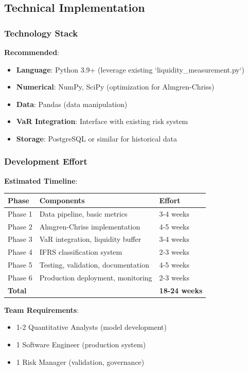\documentclass[11pt,a4paper]{article}
\begin{document}
\subsection{Technical Implementation}

\subsubsection{Technology Stack}

\textbf{Recommended}:
\begin{itemize}
    \item \textbf{Language}: Python 3.9+ (leverage existing `liquidity\_measurement.py`)
    \item \textbf{Numerical}: NumPy, SciPy (optimization for Almgren-Chriss)
    \item \textbf{Data}: Pandas (data manipulation)
    \item \textbf{VaR Integration}: Interface with existing risk system
    \item \textbf{Storage}: PostgreSQL or similar for historical data
\end{itemize}

\subsubsection{Development Effort}

\textbf{Estimated Timeline}:

\begin{table}[h]
\centering
\begin{tabular}{@{}lll@{}}
\toprule
Phase & Components & Effort \\
\midrule
Phase 1 & Data pipeline, basic metrics & 3-4 weeks \\
Phase 2 & Almgren-Chriss implementation & 4-5 weeks \\
Phase 3 & VaR integration, liquidity buffer & 3-4 weeks \\
Phase 4 & IFRS classification system & 2-3 weeks \\
Phase 5 & Testing, validation, documentation & 4-5 weeks \\
Phase 6 & Production deployment, monitoring & 2-3 weeks \\
\midrule
\textbf{Total} & & \textbf{18-24 weeks} \\
\bottomrule
\end{tabular}
\end{table}

\textbf{Team Requirements}:
\begin{itemize}
    \item 1-2 Quantitative Analysts (model development)
    \item 1 Software Engineer (production system)
    \item 1 Risk Manager (validation, governance)
\end{itemize}
\end{document}
